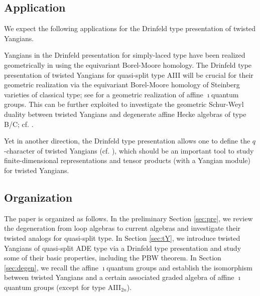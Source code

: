 \documentclass[11pt,reqno]{amsart}
\numberwithin{equation}{section}
\theoremstyle{definition}
\theoremstyle{remark}
\begin{document}
\subsection{Application}
We expect the following applications for the Drinfeld type presentation of twisted Yangians.

Yangians in the Drinfeld presentation for simply-laced type have been realized geometrically in \cite{Va00} using the equivariant Borel-Moore homology. The Drinfeld type presentation of twisted Yangians for quasi-split type AIII will be crucial for their geometric realization via the equivariant Borel-Moore homology of Steinberg varieties of classical type; see \cite{SW24} for a geometric realization of affine $\imath$quantum groups. This can be further exploited to investigate the geometric Schur-Weyl duality between twisted Yangians and degenerate affine Hecke algebras of type B/C; cf. \cite{CGM14}.


Yet in another direction, the Drinfeld type presentation allows one to define the $q$-character of twisted Yangians (cf. \cite{Kni:1995,FR99}), which should be an important tool to study finite-dimensional representations and tensor products (with a Yangian module) for twisted Yangians.

\subsection{Organization}
The paper is organized as follows. In the preliminary Section \ref{sec:pre}, we review the degeneration from loop algebras to current algebras and investigate their twisted analogs for quasi-split type. 
In Section \ref{sec:tY}, we introduce twisted Yangians of quasi-split ADE type via a Drinfeld type presentation and study some of their basic properties, including the PBW theorem. In Section \ref{sec:degen}, we recall the affine $\imath$quantum groups and establish the isomorphism between twisted Yangians and a certain associated graded algebra of affine $\imath$quantum groups (except for type AIII$_{2n}$). 
\end{document}
